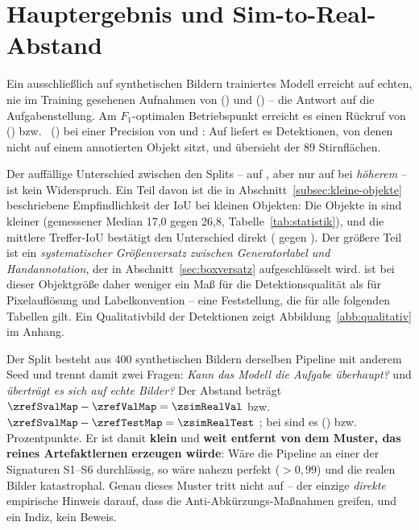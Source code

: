 \section{Hauptergebnis und Sim-to-Real-Abstand}
\label{sec:hauptergebnis}



Ein ausschließlich auf synthetischen Bildern trainiertes Modell erreicht auf
echten, nie im Training gesehenen Aufnahmen \mAPfifty{} von \textbf{\zrefValMap}
() und \textbf{\zrefTestMap} () -- die Antwort auf die
Aufgabenstellung. Am $F_1$-optimalen Betriebspunkt erreicht es einen Rückruf von
\zrefValRec{} () bzw.\ \zrefTestRec{} () bei einer Precision
von \zrefValPrec{} und \zrefTestPrec: Auf  liefert es
\znPredTest{} Detektionen, von denen \zfpTest{} nicht auf einem annotierten
Objekt sitzt, und übersieht \zfnTest{} der 89 Stirnflächen.

Der auffällige Unterschied zwischen den Splits -- \mAPseven{} \zrefValMapS{} auf
, aber nur \zrefTestMapS{} auf  bei \emph{höherem}
\mAPfifty{} -- ist kein Widerspruch. Ein Teil davon ist die in
Abschnitt~\ref{subsec:kleine-objekte} beschriebene Empfindlichkeit der IoU bei
kleinen Objekten: Die Objekte in  sind kleiner (gemessener Median 17,0 gegen
26,8\px, Tabelle~\ref{tab:statistik}), und die mittlere Treffer-IoU bestätigt
den Unterschied direkt
(\zrefTestIou{} gegen \zrefValIou). Der größere Teil ist ein \emph{systematischer
Größenversatz zwischen Generatorlabel und Handannotation}, der in
Abschnitt~\ref{sec:boxversatz} aufgeschlüsselt wird. \mAPall{} ist bei dieser
Objektgröße daher weniger ein Maß für die Detektionsqualität als für
Pixelauflösung und Labelkonvention -- eine Feststellung, die für alle folgenden
Tabellen gilt. Ein Qualitativbild der Detektionen zeigt
Abbildung~\ref{abb:qualitativ} im Anhang.

\label{sec:simtoreal}
Der Split  besteht aus 400 synthetischen Bildern derselben Pipeline
mit anderem Seed und trennt damit zwei Fragen: \emph{Kann das Modell die Aufgabe
überhaupt?} und \emph{überträgt es sich auf echte Bilder?} Der Abstand beträgt
$\zrefSvalMap - \zrefValMap = \mathbf{\zsimRealVal}$ bzw.\
$\zrefSvalMap - \zrefTestMap = \mathbf{\zsimRealTest}$\PP{} \mAPfifty{}; bei
\mAPall{} sind es \zsimRealValA{} (\code{val}) bzw.\ \zsimRealTestA{}
Prozentpunkte. Er ist damit \textbf{klein} und \textbf{weit entfernt von dem
Muster, das reines Artefaktlernen erzeugen würde}: Wäre die Pipeline an einer der
Signaturen S1--S6 durchlässig, so wäre \code{sval} nahezu perfekt ($>0{,}99$) und
die realen Bilder katastrophal. Genau dieses Muster tritt nicht auf -- der
einzige \emph{direkte} empirische Hinweis darauf, dass die
Anti-Abkürzungs-Maßnahmen greifen, und ein Indiz, kein Beweis.

